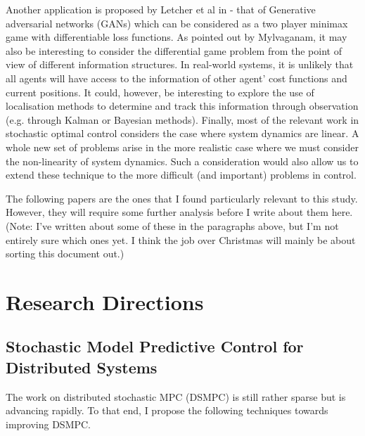 \documentclass[preprint,11pt]{report}
\begin{document}
Another application is proposed by Letcher et al in \cite{Letcher2019DifferentiableMechanics} - that
of Generative adversarial networks (GANs) which can be considered as a two player minimax game with
differentiable loss functions. As pointed out by Mylvaganam, it may also be interesting to consider
the differential game problem from the point of view of different information structures. In
real-world systems, it is unlikely that all agents will have access to the information of other
agent' cost functions and current positions. It could, however, be interesting to explore the use of
localisation methods to determine and track this information through observation (e.g. through
Kalman or Bayesian methods). Finally, most of the relevant work in stochastic optimal control
considers the case where system dynamics are linear. A whole new set of problems arise in the more
realistic case where we must consider the non-linearity of system dynamics. Such a consideration
would also allow us to extend these technique to the more difficult (and important) problems in
control.

The following papers \cite{Bailey2019FiniteDescent-Ascent, Bailey2019Multi-AgentSystem,
Boone2019FromTheory, DickensTheLearning, Berkenkamp2017SafeGuarantees,
Jin2018Stability-certifiedPerspective, Letcher2019DifferentiableMechanics} are the ones that I found
particularly relevant to this study. However, they will require some further analysis before I write
about them here. (Note: I've written about some of these in the paragraphs above, but I'm not
entirely sure which ones yet. I think the job over Christmas will mainly be about sorting this
document out.)

\chapter{Research Directions}

\section{Stochastic Model Predictive Control for Distributed Systems}

The work on distributed stochastic MPC (DSMPC) is still rather sparse but is advancing rapidly. To
that end, I propose the following techniques towards improving DSMPC.
\end{document}
